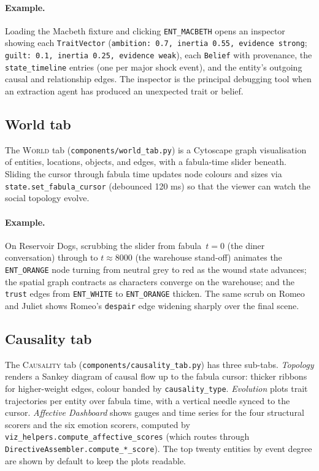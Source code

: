 \documentclass[11pt]{article}
\begin{document}
\paragraph{Example.} Loading the Macbeth fixture and clicking
\texttt{ENT\_MACBETH} opens an inspector showing each
\texttt{TraitVector} (\texttt{ambition: 0.7, inertia 0.55,
evidence strong}; \texttt{guilt: 0.1, inertia 0.25, evidence
weak}), each \texttt{Belief} with provenance, the
\texttt{state\_timeline} entries (one per major shock event),
and the entity's outgoing causal and relationship edges. The
inspector is the principal debugging tool when an extraction
agent has produced an unexpected trait or belief.

\subsection{World tab}
\label{app:ui-world}

The \textsc{World} tab
(\texttt{components/world\_tab.py}) is a Cytoscape graph
visualisation of entities, locations, objects, and edges, with a
fabula-time slider beneath. Sliding the cursor through fabula
time updates node colours and sizes via
\texttt{state.set\_fabula\_cursor} (debounced 120 ms) so that the
viewer can watch the social topology evolve.

\paragraph{Example.} On Reservoir Dogs, scrubbing the slider from
fabula~$t = 0$ (the diner conversation) through to $t \approx
8000$ (the warehouse stand-off) animates the
\texttt{ENT\_ORANGE} node turning from neutral grey to red as
the wound state advances; the spatial graph contracts as
characters converge on the warehouse; and the
\texttt{trust} edges from \texttt{ENT\_WHITE} to
\texttt{ENT\_ORANGE} thicken. The same scrub on Romeo and Juliet
shows Romeo's \texttt{despair} edge widening sharply over the
final scene.

\subsection{Causality tab}
\label{app:ui-causality}

The \textsc{Causality} tab
(\texttt{components/causality\_tab.py}) has three sub-tabs.
\emph{Topology} renders a Sankey diagram of causal flow up to the
fabula cursor: thicker ribbons for higher-weight edges, colour
banded by \texttt{causality\_type}. \emph{Evolution} plots
trait trajectories per entity over fabula time, with a vertical
needle synced to the cursor. \emph{Affective Dashboard} shows
gauges and time series for the four structural scorers and the
six emotion scorers, computed by
\texttt{viz\_helpers.compute\_affective\_scores} (which routes
through \texttt{DirectiveAssembler.compute\_*\_score}). The top
twenty entities by event degree are shown by default to keep the
plots readable.
\end{document}
